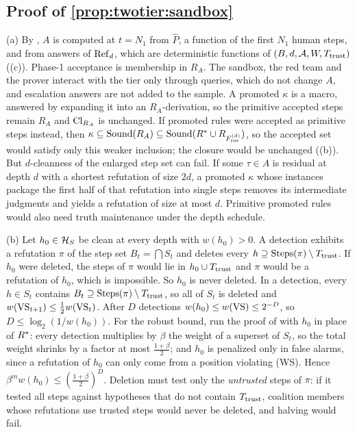 \subsection{Proof of \texorpdfstring{\cref{prop:twotier:sandbox}}{the sandbox proposition}}\label{app:twotier:sandbox}

(a) By , $A$ is computed at $t=N_1$ from $\hat P$, a function of the first $N_1$ human steps, and from answers of $\mathrm{Ref}_d$, which are deterministic functions of $(B,d,\mathcal{A},W,T_{\mathrm{trust}})$ ((c)). Phase-1 acceptance is membership in $R_A$. The sandbox, the red team and the prover interact with the tier only through queries, which do not change $A$, and escalation answers are not added to the sample. A promoted $\kappa$ is a macro, answered by expanding it into an $R_A$-derivation, so the primitive accepted steps remain $R_A$ and $\mathrm{Cl}_{R_A}$ is unchanged. If promoted rules were accepted as primitive steps instead, then $\kappa\subseteq\mathrm{Sound}(R_A)\subseteq\mathrm{Sound}(R^{*}\cup R_{F^{(d)}_{\mathrm{res}}})$, so the accepted set would satisfy only this weaker inclusion; the closure would be unchanged ((b)). But $d$-cleanness of the enlarged step set can fail. If some $\tau\in A$ is residual at depth $d$ with a shortest refutation of size $2d$, a promoted $\kappa$ whose instances package the first half of that refutation into single steps removes its intermediate judgments and yields a refutation of size at most $d$. Primitive promoted rules would also need truth maintenance under the depth schedule.

(b) Let $h_0\in\mathcal{H}_S$ be clean at every depth with $w(h_0)>0$. A detection exhibits a refutation $\pi$ of the step set $B_t=\bigcap S_t$ and deletes every $h\supseteq\mathrm{Steps}(\pi)\setminus T_{\mathrm{trust}}$. If $h_0$ were deleted, the steps of $\pi$ would lie in $h_0\cup T_{\mathrm{trust}}$ and $\pi$ would be a refutation of $h_0$, which is impossible. So $h_0$ is never deleted. In a detection, every $h\in S_t$ contains $B_t\supseteq\mathrm{Steps}(\pi)\setminus T_{\mathrm{trust}}$, so all of $S_t$ is deleted and $w(\mathrm{VS}_{t+1})\le\frac12w(\mathrm{VS}_t)$. After $D$ detections $w(h_0)\le w(\mathrm{VS})\le2^{-D}$, so $D\le\log_2(1/w(h_0))$. For the robust bound, run the proof of  with $h_0$ in place of $R^{*}$: every detection multiplies by $\beta$ the weight of a superset of $S_t$, so the total weight shrinks by a factor at most $\frac{1+\beta}2$; and $h_0$ is penalized only in false alarms, since a refutation of $h_0$ can only come from a position violating (WS). Hence $\beta^mw(h_0)\le(\frac{1+\beta}2)^D$. Deletion must test only the \emph{untrusted} steps of $\pi$: if it tested all steps against hypotheses that do not contain $T_{\mathrm{trust}}$, coalition members whose refutations use trusted steps would never be deleted, and halving would fail.

